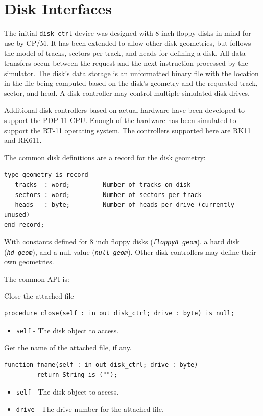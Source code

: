\documentclass[10pt, openany]{book}
\newcommand{\constant}[1]{\emph{\texttt{#1}}}
\newcommand{\keyword}[1]{\texttt{#1}}
\begin{document}
\section{Disk Interfaces}
The initial \verb|disk_ctrl| device was designed with 8 inch floppy disks in mind for use by CP/M.
It has been extended to allow other disk geometries, but follows the model of tracks, sectors per track, and heads for defining a disk.
All data transfers occur between the request and the next instruction processed by the simulator.
The disk's data storage is an unformatted binary file with the location in the file being computed based on the disk's geometry and the requested track, sector, and head.
A disk controller may control multiple simulated disk drives.

Additional disk controllers based on actual hardware have been developed to support the PDP-11 CPU.
Enough of the hardware has been simulated to support the RT-11 operating system.
The controllers supported here are RK11 and RK611.

The common disk definitions are a record for the disk geometry:
\begin{lstlisting}
type geometry is record
   tracks  : word;     --  Number of tracks on disk
   sectors : word;     --  Number of sectors per track
   heads   : byte;     --  Number of heads per drive (currently unused)
end record;
\end{lstlisting}
With constants defined for 8 inch floppy disks (\constant{floppy8\_geom}), a hard disk (\constant{hd\_geom}), and a null value (\constant{null\_geom}).  Other disk controllers may define their own geometries.

The common API is:

Close the attached file
\begin{lstlisting}
procedure close(self : in out disk_ctrl; drive : byte) is null;
\end{lstlisting}
\begin{itemize}
  \item \keyword{self} - The disk object to access.
\end{itemize}

Get the name of the attached file, if any.
\begin{lstlisting}
function fname(self : in out disk_ctrl; drive : byte)
         return String is ("");
\end{lstlisting}
\begin{itemize}
  \item \keyword{self} - The disk object to access.
  \item \keyword{drive} - The drive number for the attached file.
\end{itemize}
\end{document}
